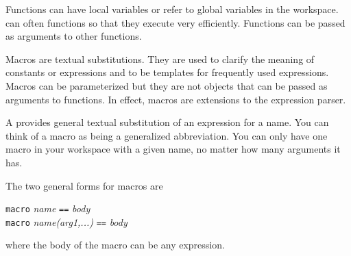 Functions can have local variables or refer to global variables in the
workspace.
\Language{} can often  functions so that
they execute very efficiently.
Functions can be passed as arguments to other functions.

Macros are textual substitutions.
They are used to clarify the meaning of constants or expressions and to be
templates for frequently used expressions.
Macros can be parameterized but they are not objects that can be passed as
arguments to functions.
In effect, macros are extensions to the \Language{} expression parser.


A  provides general textual substitution of
an \Language{} expression for a name.
You can think of a macro as being a generalized abbreviation.
You can only have one macro in your workspace with
a given name, no matter how many arguments it has.

\beginImportant
The two general forms for macros are
\begin{center}
{\tt macro} {\it name} {\tt ==} {\it body} \\
{\tt macro} {\it name(arg1,...)} {\tt ==} {\it body}
\end{center}
where the body of the macro can be any \Language{} expression.
\endImportant

